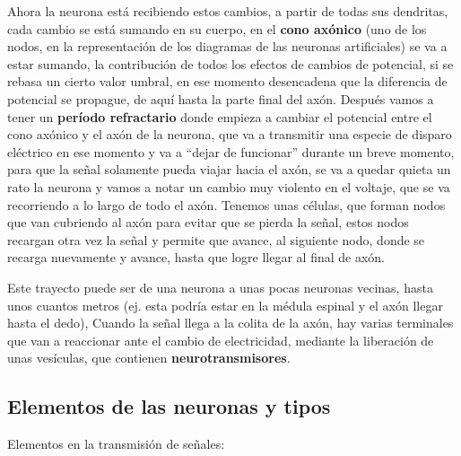 Ahora la neurona está recibiendo estos cambios, a partir de todas sus dendritas, cada cambio se está sumando en su cuerpo, en el \textbf{cono axónico} (uno de los nodos, en la representación de los diagramas de las neuronas artificiales) se va a estar sumando, la contribución de todos los efectos de cambios de potencial, si se rebasa un cierto valor umbral, en ese momento desencadena que la diferencia de potencial se propague, de aquí hasta la parte final del axón. Después vamos a tener un \textbf{período refractario} donde empieza a cambiar el potencial entre el cono axónico y el axón de la neurona, que va a transmitir una especie de disparo eléctrico en ese momento y va a “dejar de funcionar” durante un breve momento, para que la señal solamente pueda viajar hacia el axón, se va a quedar quieta un rato la neurona y vamos a notar un cambio muy violento en el voltaje, que se va recorriendo a lo largo de todo el axón. Tenemos unas células, que forman nodos que van cubriendo al axón para evitar que se pierda la señal, estos nodos recargan otra vez la señal y permite que avance, al siguiente nodo, donde se recarga  nuevamente y avance, hasta que logre llegar al final de axón.

Este trayecto puede ser de una neurona a unas pocas neuronas vecinas, hasta unos cuantos metros (ej. esta podría estar en la médula espinal y el axón llegar hasta el dedo), Cuando la señal llega a la colita de la axón, hay varias terminales que van a reaccionar ante el cambio de electricidad, mediante la liberación de unas vesículas, que contienen \textbf{neurotransmisores}.


\subsection{Elementos de las neuronas y tipos}

Elementos en la transmisión de señales:

